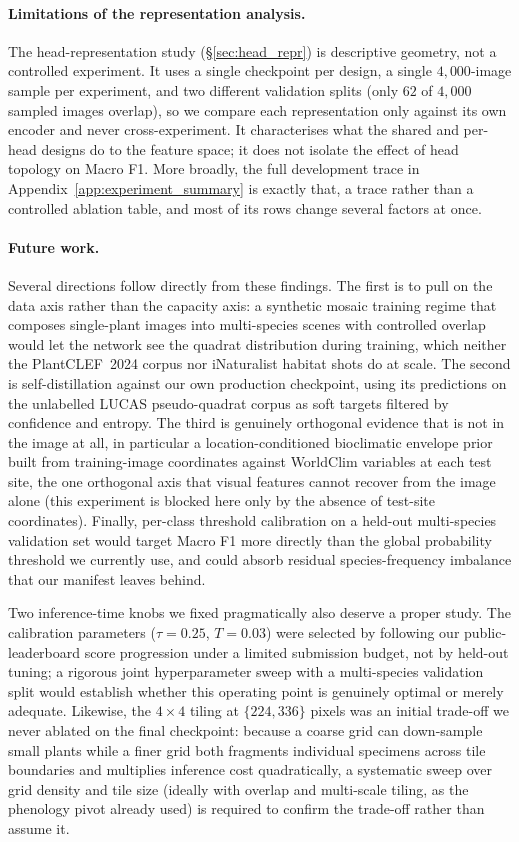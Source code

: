 \paragraph{Limitations of the representation analysis.} The head-representation study
(\S\ref{sec:head_repr}) is descriptive geometry, not a controlled experiment. It uses a single
checkpoint per design, a single $4{,}000$-image sample per experiment, and two different
validation splits (only $62$ of $4{,}000$ sampled images overlap), so we compare each
representation only against its own encoder and never cross-experiment. It characterises what the
shared and per-head designs do to the feature space; it does not isolate the effect of head
topology on Macro F1. More broadly, the full development trace in
Appendix~\ref{app:experiment_summary} is exactly that, a trace rather than a controlled
ablation table, and most of its rows change several factors at once.

\paragraph{Future work.} Several directions follow directly from these findings. The first is to
pull on the data axis rather than the capacity axis: a synthetic mosaic training regime that
composes single-plant images into multi-species scenes with controlled overlap would let the
network see the quadrat distribution during training, which neither the PlantCLEF~2024 corpus nor
iNaturalist habitat shots do at scale. The second is self-distillation against our own production
checkpoint, using its predictions on the unlabelled LUCAS pseudo-quadrat corpus as soft targets
filtered by confidence and entropy. The third is genuinely orthogonal evidence that is not in the
image at all, in particular a location-conditioned bioclimatic envelope prior built from
training-image coordinates against WorldClim variables at each test site, the one orthogonal axis
that visual features cannot recover from the image alone (this experiment is blocked here only by
the absence of test-site coordinates). Finally, per-class threshold calibration on a held-out
multi-species validation set would target Macro F1 more directly than the global probability
threshold we currently use, and could absorb residual species-frequency imbalance that our
manifest leaves behind.

Two inference-time knobs we fixed pragmatically also deserve a proper study. The calibration
parameters ($\tau{=}0.25$, $T{=}0.03$) were selected by following our public-leaderboard score
progression under a limited submission budget, not by held-out tuning; a rigorous joint
hyperparameter sweep with a multi-species validation split would establish whether this operating
point is genuinely optimal or merely adequate. Likewise, the $4\times4$ tiling at $\{224, 336\}$
pixels was an initial trade-off we never ablated on the final checkpoint: because a coarse grid can
down-sample small plants while a finer grid both fragments individual specimens across tile
boundaries and multiplies inference cost quadratically, a systematic sweep over grid density and
tile size (ideally with overlap and multi-scale tiling, as the phenology pivot already used) is
required to confirm the trade-off rather than assume it.
